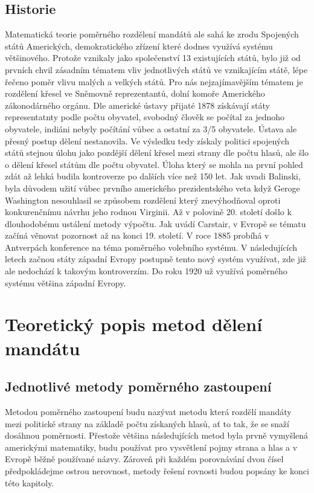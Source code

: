\documentclass[12pt]{report}
\begin{document}
\section{Historie} Matematická teorie poměrného rozdělení mandátů ale sahá ke zrodu Spojených států Amerických, demokratického zřízení které dodnes využívá systému většinového.\autocite{BAL2} Protože vznikaly jako společenství 13 existujících států, bylo již od prvních chvil zásadním tématem vliv jednotlivých států ve vznikajícím státě, lépe řečeno poměr vlivu malých a velkých států.
Pro nás nejzajímavějším tématem je rozdělení křesel ve Sněmovně reprezentantů, dolní komoře Amerického zákonodárného orgánu.
Dle americké ústavy přijaté 1878 získávají státy representatnty podle počtu obyvatel, svobodný člověk se počítal za jednoho obyvatele, indiáni nebyly počítání vůbec a ostatní za 3/5 obyvatele.\autocite{CON} Ústava ale přesný postup dělení nestanovila.
Ve výsledku tedy získaly politici spojených států stejnou úlohu jako pozdější dělení křesel mezi strany dle počtu hlasů, ale šlo o dělení křesel státům dle počtu obyvatel.
Úloha který se mohla na první pohled zdát až lehká budila kontroverze po dalších více než 150 let.
Jak uvadi Balinski, byla důvodem užití vůbec prvního amerického prezidentského veta když Geroge Washington nesouhlasil se způsobem rozdělení který znevýhodňoval oproti konkurenčnímu návrhu jeho rodnou Virginii.\autocite{BAL1}
Až v polovině 20.
století došlo k dlouhodobému ustálení metody výpočtu.
Jak uvádí Carstair, v Evropě se tématu začíná věnovat pozornost až na konci 19.
století.
V roce 1885 probíhá v Antverpách konference na téma poměrného volebního systému.
V následujících letech začnou státy západní Evropy postupně tento nový systém využívat, zde již ale nedochází k takovým kontroverzím.
Do roku 1920 už využívá poměrného systému většina západní Evropy.\autocite{BOO} 
\chapter{Teoretický popis metod dělení mandátu}
\section{Jednotlivé metody poměrného zastoupení} Metodou poměrného zastoupení budu nazývat metodu která rozdělí mandáty mezi politické strany na základě počtu získaných hlasů, ať to tak, že se snaží dosáhnou poměrnosti.
Přestože většina následujících metod byla prvně vymyšlená americkými matematiky, budu používat pro vysvětlení pojmy strana a hlas a v Evropě běžně používané názvy.
Zároveň při každém porovnávání dvou čísel předpokládejme ostrou nerovnost, metody řešení rovnosti budou popsány ke konci této kapitoly.
\end{document}
